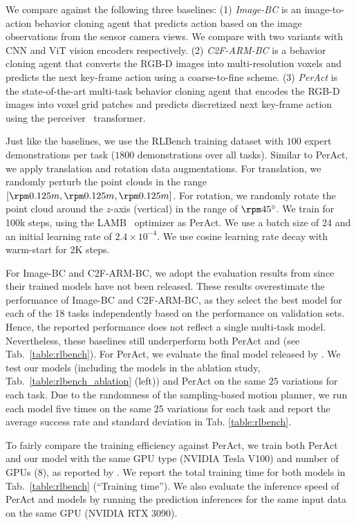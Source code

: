 We compare against the following three baselines: (1) \textit{Image-BC} \cite{jang2021bcz} is an image-to-action behavior cloning agent that predicts action based on the image observations from the sensor camera views. We compare with two variants with CNN and ViT vision encoders respectively. (2) \textit{C2F-ARM-BC} \cite{c2farm} is a behavior cloning agent that converts the RGB-D images into multi-resolution voxels and predicts the next key-frame action using a coarse-to-fine scheme. (3) \textit{PerAct} \cite{peract2022arxiv} is the state-of-the-art multi-task behavior cloning agent that encodes the RGB-D images into voxel grid patches and predicts discretized next key-frame action using the perceiver~\cite{jaegle2021perceiver} transformer.

Just like the baselines, we use the RLBench training dataset with $100$ expert demonstrations per task ($1800$ demonstrations over all tasks). Similar to PerAct, we apply translation and rotation data augmentations. For translation, we randomly perturb the point clouds in the range $\left[\rpm 0.125 m, \rpm 0.125 m, \rpm 0.125 m\right]$. For rotation, we randomly rotate the point cloud around the $z$-axis (vertical) in the range of $\rpm45^{\circ}$. We train \method for 100k steps, using the LAMB~\cite{you2019large} optimizer as PerAct. We use a batch size of 24 and an initial learning rate of $2.4\times10^{-4}$. We use cosine learning rate decay with warm-start for 2K steps.

For Image-BC and C2F-ARM-BC, we adopt the evaluation results from \cite{peract2022arxiv} since their trained models have not been released. These results overestimate the performance of Image-BC and C2F-ARM-BC, as they select the best model for each of the 18 tasks independently based on the performance on validation sets. Hence, the reported performance does not reflect a single multi-task model. Nevertheless, these baselines still underperform both PerAct and \method (see Tab.~\ref{table:rlbench}). For PerAct, we evaluate the final model released by \citet{peract2022arxiv}.  We test our models (including the models in the ablation study, Tab.~\ref{table:rlbench_ablation} (left)) and PerAct on the same $25$ variations for each task. Due to the randomness of the sampling-based motion planner, we run each model five times on the same $25$ variations for each task and report the average success rate and standard deviation in Tab. \ref{table:rlbench}.

To fairly compare the training efficiency against PerAct, we train both PerAct and our model with the same GPU type (NVIDIA Tesla V100) and number of GPUs (8), as reported by \citet{peract2022arxiv}. We report the total training time for both models in Tab.~\ref{table:rlbench} (``Training time''). We also evaluate the inference speed of PerAct and \method models by running the prediction inferences for the same input data on the same GPU (NVIDIA RTX 3090). 

